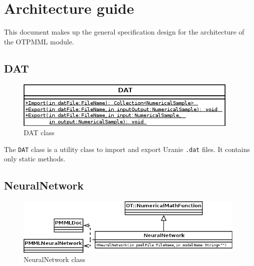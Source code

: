 %

\section{Architecture guide}

This document makes up the general specification design for the architecture of the OTPMML module.

\subsection{DAT}

\begin{figure}[htb]
  \begin{center}
    \includegraphics[scale=0.8]{DAT.png}
    \caption{DAT class}\label{fig:archi:DAT}
  \end{center}
\end{figure}

The \texttt{DAT} class is a utility class to import and export Uranie \texttt{.dat} files.  It contains only static methods.

\subsection{NeuralNetwork}

\begin{figure}[htb]
  \begin{center}
    \includegraphics[scale=0.8]{NeuralNetwork.png}
    \caption{NeuralNetwork class}\label{fig:archi:NeuralNetwork}
  \end{center}
\end{figure}

